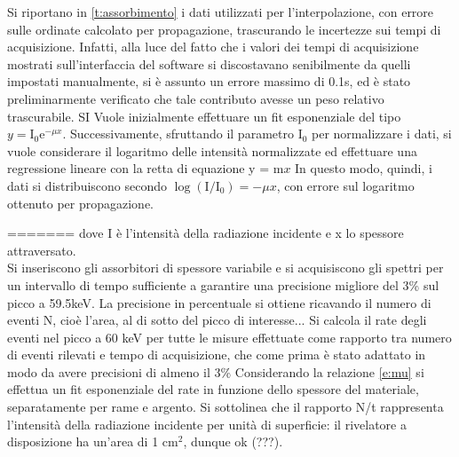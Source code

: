 \documentclass[twocolumn,10pt]{asme2ej}
\begin{document}
Si riportano in \autoref{t:assorbimento} i dati utilizzati per l'interpolazione, con errore sulle ordinate calcolato per 
propagazione, trascurando le incertezze sui tempi di acquisizione. Infatti, alla luce del fatto che i valori dei tempi di
acquisizione mostrati sull'interfaccia del software si discostavano senibilmente da quelli impostati manualmente, si è 
assunto un errore massimo di 0.1\si{\second}, ed è stato preliminarmente verificato che tale contributo avesse un peso 
relativo trascurabile. SI Vuole inizialmente effettuare un fit esponenziale del tipo $y = \text{I}_0 \text{e}^{-\mu x }$. 
Successivamente, sfruttando il parametro $\text{I}_0 $ per normalizzare i dati, si vuole considerare il logaritmo delle 
intensità normalizzate ed effettuare una regressione lineare con la retta  di equazione y = m$x$  In questo modo, quindi, 
i dati si distribuiscono secondo $\log(\text{I}/\text{I}_0)=-\mu x$, con errore sul logaritmo ottenuto per propagazione. 


    

=======
dove I è l'intensità della radiazione incidente e x lo spessore attraversato. \\ Si inseriscono gli assorbitori di
spessore variabile e si acquisiscono gli spettri per un intervallo di tempo sufficiente a garantire una precisione
migliore del 3\% sul picco a 59.5keV. La precisione in percentuale si ottiene ricavando il numero di eventi N, cioè
l'area, al di sotto del picco di interesse... Si calcola il rate degli eventi nel picco a 60 keV per tutte le misure
effettuate come rapporto tra numero di eventi rilevati e tempo di acquisizione, che come prima è stato adattato in modo
da avere precisioni di almeno il 3\% Considerando la relazione \autoref{e:mu} si effettua un fit esponenziale del rate
in funzione dello spessore del materiale, separatamente per rame e argento. Si sottolinea che il rapporto N/t
rappresenta l'intensità della radiazione incidente per unità di superficie: il rivelatore a disposizione ha un'area di 1
$\si{\centi\metre}^2$, dunque ok (???).
\end{document}
